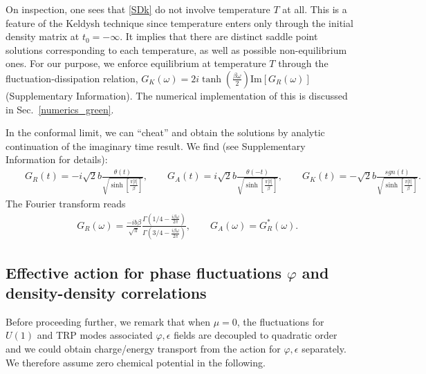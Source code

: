 \documentclass[twocolumn,floatfix,superscriptaddress]{revtex4-1}
\begin{document}
\begin{widetext}
On inspection, one sees that \eqref{SDk} do not involve temperature $T$ at all.  This is a feature of the Keldysh technique since temperature enters only through the initial density matrix at $t_0= -\infty$.   It implies that there are distinct saddle point solutions corresponding to each temperature, as well as possible non-equilibrium ones.  For our purpose, we enforce equilibrium at temperature $T$ through the fluctuation-dissipation relation, $G_K(\omega) =2i\tanh(\frac{\beta\omega}{2})\text{Im}[G_R(\omega)]$ (Supplementary Information).  The numerical implementation of this is discussed in Sec.~\ref{numerics_green}.   

In the conformal limit, we can ``cheat'' and obtain the solutions by analytic continuation of the imaginary time result.  We find (see Supplementary Information for details):
\begin{eqnarray}
\label{G_re}
&&G_R(t)=-i\sqrt 2 b\frac{\theta(t)}{\sqrt{\sinh [\frac{\pi |t|}{\beta}]}},\qquad
G_A(t)=i\sqrt 2 b\frac{\theta(-t)}{\sqrt{\sinh [\frac{\pi |t|}{\beta}]}},\qquad G_K(t)=- \sqrt 2 b\frac{sgn(t)}{\sqrt{\sinh [\frac{\pi |t|}{\beta}]}}.
\end{eqnarray}
The Fourier transform reads
\begin{eqnarray}
\label{G_re_f}
&&G_R(\omega)=\frac{-ib\beta}{\sqrt {\pi}}\frac{\Gamma(1/4-\frac{i\beta\omega}{2\pi})}{\Gamma(3/4-\frac{i\beta\omega}{2\pi})},\qquad G_A(\omega)=G_R^*(\omega).
\end{eqnarray}


\subsection{Effective action for phase fluctuations $\varphi$ and density-density correlations}
Before proceeding further, we remark that when $\mu=0$, the fluctuations for $U(1)$ and TRP modes associated $\varphi,\epsilon$ fields are decoupled to quadratic order and we could obtain charge/energy transport from the action for $\varphi,\epsilon$ separately. We therefore assume zero chemical potential in the following.  


\end{widetext}
\end{document}
